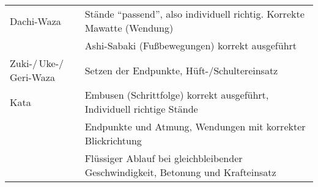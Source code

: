 	\null\vfill\null
	{\small
	\begin{tabularx}{\textwidth}{ll}
		\midrule
		Dachi-Waza					& Stände \textquotedblleft passend\textquotedblright , also individuell richtig. Korrekte Mawatte (Wendung) \\
		& Ashi-Sabaki (Fußbewegungen) korrekt ausgeführt \\
		Zuki-/\,Uke-/\,Geri-Waza	& Setzen der Endpunkte, Hüft-/Schultereinsatz \\
		Kata						& Embusen (Schrittfolge) korrekt ausgeführt, Individuell richtige Stände \\
		& Endpunkte und Atmung, Wendungen mit korrekter Blickrichtung \\
		& Flüssiger Ablauf bei gleichbleibender Geschwindigkeit, Betonung und Krafteinsatz \\
		\midrule
	\end{tabularx}}\null\vfill\null
